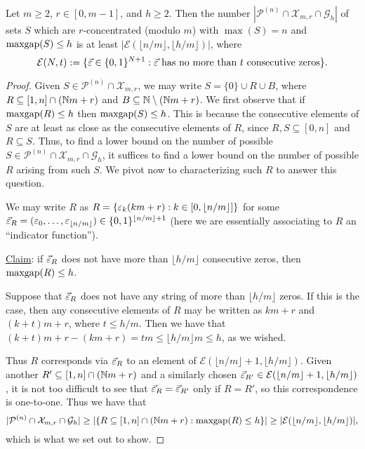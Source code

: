 \begin{lemma} \label{lem:concentration to tuples}
Let $m\ge 2$, $r\in [0,m-1]$, and $h\ge 2$.
Then the number $|\mathcal{P}^{(n)}\cap \mathcal{X}_{m,r}\cap \mathcal{G}_h|$ of sets $S$ which are $r$-concentrated (modulo $m$) with $\max(S) = n$ and $\operatorname{maxgap}(S)\le h$ is at least $|\mathcal{E}(\lfloor n/m \rfloor, \lfloor h/m \rfloor)|$, where
\[ \mathcal{E}(N,t) := \{ \vec{\varepsilon}\in \{0,1\}^{N+1}: \vec{\varepsilon} \textrm{ has no more than $t$ consecutive zeros}\}. \]
\end{lemma}
\begin{proof}
Given $S\in \mathcal{P}^{(n)}\cap \mathcal{X}_{m,r}$, we may write $S = \{0\}\cup R \cup B$, where $R \subseteq [1,n]\cap (\mathbb{N} m+r)$ and $B\subseteq \mathbb{N}\setminus (\mathbb{N} m + r)$.
We first observe that if $\operatorname{maxgap}(R)\le h$ then $\operatorname{maxgap}(S)\le h$.
This is because the consecutive elements of $S$ are at least as close as the consecutive elements of $R$, since $R,S\subseteq [0,n]$ and $R\subseteq S$.
Thus, to find a lower bound on the number of possible $S\in \mathcal{P}^{(n)}\cap \mathcal{X}_{m,r}\cap \mathcal{G}_h$, it suffices to find a lower bound on the number of possible $R$ arising from such $S$.
We pivot now to characterizing such $R$ to answer this question.

We may write $R$ as $R = \{ \varepsilon_k(km+r): k\in [0,\lfloor n/m \rfloor] \}$ for some $\vec{\varepsilon}_R = (\varepsilon_0,\dots,\varepsilon_{\lfloor n/m \rfloor}) \in \{0,1\}^{\lfloor n/m \rfloor+1}$ (here we are essentially associating to $R$ an ``indicator function'').

\underline{Claim}: if $\vec{\varepsilon}_R$ does not have more than $\lfloor h/m \rfloor$ consecutive zeros, then $\operatorname{maxgap}(R) \le h$.

Suppose that $\vec{\varepsilon}_R$ does not have any string of more than $\lfloor h/m \rfloor$ zeros.
If this is the case, then any consecutive elements of $R$ may be written as $km+r$ and $(k+t)m+r$, where $t\le h/m$.
Then we have that $(k+t)m+r - (km+r) = tm \le \lfloor h/m \rfloor m \le h$, as we wished.

Thus $R$ corresponds via $\vec{\varepsilon}_R$ to an element of $\mathcal{E}(\lfloor n/m \rfloor+1,\lfloor h/m \rfloor)$.
Given another $R'\subseteq [1,n]\cap (\mathbb{N} m+ r)$ and a similarly chosen $\vec{\varepsilon}_{R'}\in \mathcal{E}(\lfloor n/m \rfloor+1,\lfloor h/m \rfloor)$, it is not too difficult to see that $\vec{\varepsilon}_R = \vec{\varepsilon}_{R'}$ only if $R=R'$, so this correspondence is one-to-one.
Thus we have that 
\[ |\mathcal{P}^{(n)}\cap \mathcal{X}_{m,r}\cap \mathcal{G}_h| 
\ge |\{ R\subseteq [1,n]\cap (\mathbb{N} m + r): \operatorname{maxgap}(R)\le h\}| 
\ge |\mathcal{E}(\lfloor n/m \rfloor, \lfloor h/m \rfloor)|, \]
which is what we set out to show.
\end{proof}

